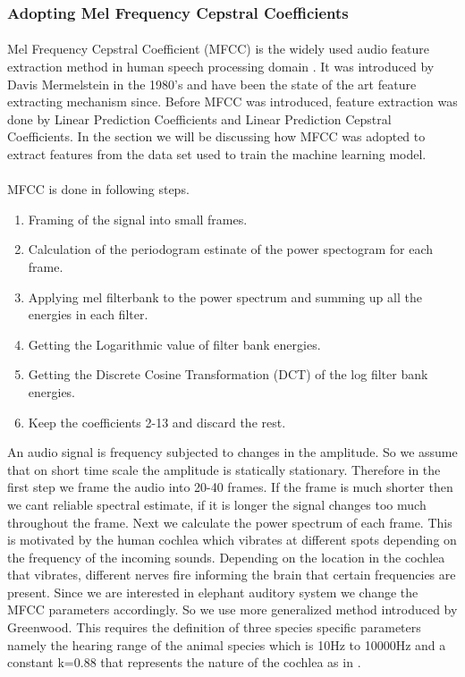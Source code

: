 \documentclass[12pt]{article}
\numberwithin{figure}{section}
\numberwithin{table}{section}
\begin{document}
\subsubsection{Adopting Mel Frequency Cepstral Coefficients}
\paragraph{}
Mel Frequency Cepstral Coefficient (MFCC) is the widely used audio feature extraction method in human speech processing domain \cite{36}. It was introduced by Davis Mermelstein in the 1980's and have been the state of the art feature extracting mechanism since. Before MFCC was introduced, feature extraction was done by Linear Prediction Coefficients and Linear Prediction Cepstral Coefficients. In the section we will be discussing how MFCC was adopted to extract features from the data set used to train the machine learning model.

\paragraph{}
MFCC is done in following steps.

\begin{enumerate}
  \item Framing of the signal into small frames.
  \item Calculation of the periodogram estinate of the power spectogram for each frame.
  \item Applying mel filterbank to the power spectrum and summing up all the energies in each filter.
  \item Getting the Logarithmic value of filter bank energies.
  \item Getting the Discrete Cosine Transformation (DCT) of the log filter bank energies.
  \item Keep the coefficients 2-13 and discard the rest.
\end{enumerate}

An audio signal is frequency subjected to changes in the amplitude. So we assume that on short time scale the amplitude is statically stationary. Therefore in the first step we frame the audio into 20-40 frames. If the frame is much shorter then we cant reliable spectral estimate, if it is longer the signal changes too much throughout the frame. Next we calculate the power spectrum of each frame. This is motivated by the human cochlea which vibrates at different spots depending on the frequency of the incoming sounds. Depending on the location in the cochlea that vibrates, different nerves fire informing the brain that certain frequencies are present. Since we are interested in elephant auditory system we change the MFCC parameters accordingly. So we use more generalized method introduced by Greenwood. This requires the definition of three species specific parameters namely the hearing range of the animal species which is 10Hz to 10000Hz and a constant k=0.88  that represents the nature of the cochlea as in \cite {37}. 
\end{document}
